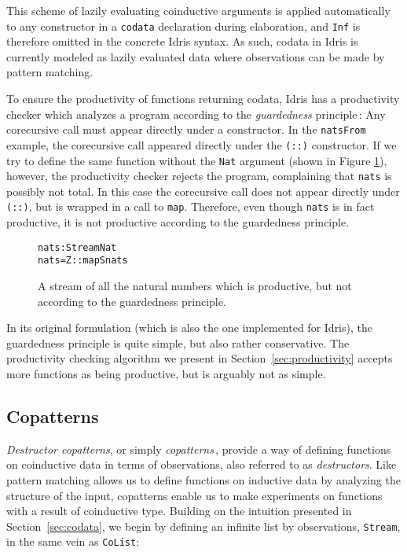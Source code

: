 This scheme of lazily evaluating coinductive arguments is applied automatically to any constructor in a \texttt{codata} declaration during elaboration, and \texttt{Inf} is therefore omitted in the concrete Idris syntax. As such, codata in Idris is currently modeled as lazily evaluated data where observations can be made by pattern matching.

To ensure the productivity of functions returning codata, Idris has a productivity checker which analyzes a program according to the \emph{guardedness} principle\,\citep{Coquand94,Gimenez95}: Any corecursive call must appear directly under a constructor. In the \texttt{natsFrom} example, the corecursive call appeared directly under the \texttt{(::)} constructor. If we try to define the same function without the \texttt{Nat} argument (shown in Figure \ref{fig:nats}), however, the productivity checker rejects the program, complaining that \texttt{nats} is possibly not total. In this case the corecursive call does not appear directly under \texttt{(::)}, but is wrapped in a call to \texttt{map}. Therefore, even though \texttt{nats} is in fact productive, it is not productive according to the guardedness principle.

\begin{figure}
\begin{alltt}
nats : Stream Nat
nats = Z :: map S nats
\end{alltt}
\caption{A stream of all the natural numbers which is productive, but not according to the guardedness principle.}
\label{fig:nats}
\end{figure}

In its original formulation (which is also the one implemented for Idris), the guardedness principle is quite simple, but also rather conservative. The productivity checking algorithm we present in Section~\ref{sec:productivity} accepts more functions as being productive, but is arguably not as simple.

\subsection{Copatterns}
\emph{Destructor copatterns}, or simply \emph{copatterns}\,\citep{Abel13Copatterns}, provide a way of defining functions on coinductive data in terms of observations, also referred to as \emph{destructors}. Like pattern matching allows us to define functions on inductive data by analyzing the structure of the input, copatterns enable us to make experiments on functions with a result of coinductive type. Building on the intuition presented in Section~\ref{sec:codata}, we begin by defining an infinite list by observations, \texttt{Stream}, in the same vein as \texttt{CoList}:

